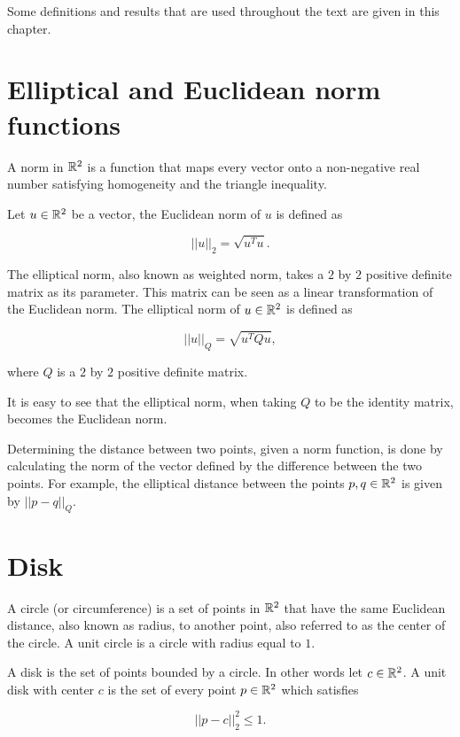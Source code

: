 Some definitions and results that are used throughout the text are given in this chapter.

\section{Elliptical and Euclidean norm functions}

A norm in $\mathbb{R}^2$ is a function that maps every vector onto a non-negative real number satisfying homogeneity and the triangle inequality. 

Let $u \in \mathbb{R}^2$ be a vector, the Euclidean norm of $u$ is defined as

\begin{equation}\label{eq:norm2}
||u||_2 = \sqrt{u^{T}u}.
\end{equation}

\noindent The elliptical norm, also known as weighted norm, takes a $2$ by $2$ positive definite matrix as its parameter. This matrix can be seen as a linear transformation of the Euclidean norm. The elliptical norm of $u \in\mathbb{R}^2$ is defined as 

\begin{equation}
||u||_{Q} = \sqrt{u^{T}Qu},
\end{equation}

\noindent where $Q$ is a $2$ by $2$ positive definite matrix.

It is easy to see that the elliptical norm, when taking $Q$ to be the identity matrix, becomes the Euclidean norm.

Determining the distance between two points, given a norm function, is done by calculating the norm of the vector defined by the difference between the two points. For example, the elliptical distance between the points $p,q \in \mathbb{R}^2$ is given by $||p-q||_{Q}$.

\section{Disk}

A circle (or circumference) is a set of points in $\mathbb{R}^2$ that have the same Euclidean distance, also known as radius, to another point, also referred to as the center of the circle. A unit circle is a circle with radius equal to $1$.

A disk is the set of points bounded by a circle. In other words let $c \in \mathbb{R}^2$. A unit disk with center $c$ is the set of every point $p \in \mathbb{R}^2$ which satisfies

\begin{equation}\label{eq:disk}
||p-c||_2^2 \le 1.
\end{equation} 

